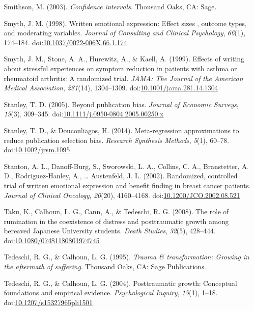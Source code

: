 \documentclass[english,man]{apa6}
\theoremstyle{definition}
\theoremstyle{definition}
\theoremstyle{definition}
\theoremstyle{remark}
\begin{document}
\hypertarget{ref-Smithson2003}{}
Smithson, M. (2003). \emph{Confidence intervals}. Thousand Oaks, CA:
Sage.

\hypertarget{ref-Smyth1998}{}
Smyth, J. M. (1998). Written emotional expression: Effect sizes ,
outcome types, and moderating variables. \emph{Journal of Consulting and
Clinical Psychology}, \emph{66}(1), 174--184.
doi:\href{https://doi.org/10.1037/0022-006X.66.1.174}{10.1037/0022-006X.66.1.174}

\hypertarget{ref-Smyth1999}{}
Smyth, J. M., Stone, A. A., Hurewitz, A., \& Kaell, A. (1999). Effects
of writing about stressful experiences on symptom reduction in patients
with asthma or rheumatoid arthritis: A randomized trial. \emph{JAMA: The
Journal of the American Medical Association}, \emph{281}(14),
1304--1309.
doi:\href{https://doi.org/10.1001/jama.281.14.1304}{10.1001/jama.281.14.1304}

\hypertarget{ref-Stanley2005}{}
Stanley, T. D. (2005). Beyond publication bias. \emph{Journal of
Economic Surveys}, \emph{19}(3), 309--345.
doi:\href{https://doi.org/10.1111/j.0950-0804.2005.00250.x}{10.1111/j.0950-0804.2005.00250.x}

\hypertarget{ref-Stanley2014}{}
Stanley, T. D., \& Doucouliagos, H. (2014). Meta-regression
approximations to reduce publication selection bias. \emph{Research
Synthesis Methods}, \emph{5}(1), 60--78.
doi:\href{https://doi.org/10.1002/jrsm.1095}{10.1002/jrsm.1095}

\hypertarget{ref-Stanton2002}{}
Stanton, A. L., Danoff-Burg, S., Sworowski, L. A., Collins, C. A.,
Branstetter, A. D., Rodriguez-Hanley, A., \ldots{} Austenfeld, J. L.
(2002). Randomized, controlled trial of written emotional expression and
benefit finding in breast cancer patients. \emph{Journal of Clinical
Oncology}, \emph{20}(20), 4160--4168.
doi:\href{https://doi.org/10.1200/JCO.2002.08.521}{10.1200/JCO.2002.08.521}

\hypertarget{ref-Taku2008}{}
Taku, K., Calhoun, L. G., Cann, A., \& Tedeschi, R. G. (2008). The role
of rumination in the coexistence of distress and posttraumatic growth
among bereaved Japanese University students. \emph{Death Studies},
\emph{32}(5), 428--444.
doi:\href{https://doi.org/10.1080/07481180801974745}{10.1080/07481180801974745}

\hypertarget{ref-Tedeschi1995}{}
Tedeschi, R. G., \& Calhoun, L. G. (1995). \emph{Trauma \&
transformation: Growing in the aftermath of suffering.} Thousand Oaks,
CA: Sage Publications.

\hypertarget{ref-Tedeschi2004}{}
Tedeschi, R. G., \& Calhoun, L. G. (2004). Posttraumatic growth:
Conceptual foundations and empirical evidence. \emph{Psychological
Inquiry}, \emph{15}(1), 1--18.
doi:\href{https://doi.org/10.1207/s15327965pli1501}{10.1207/s15327965pli1501}
\end{document}
